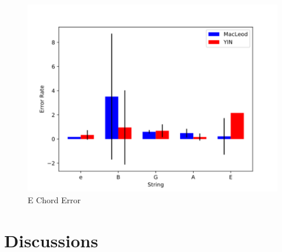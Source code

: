 \begin{figure}[!htpb]
  \centering
  \caption{E Chord Error}
  \label{e-chord-error}
  \includegraphics[scale=0.85]{images/measurements/e-chord-error}
\end{figure}

\section{Discussions}


